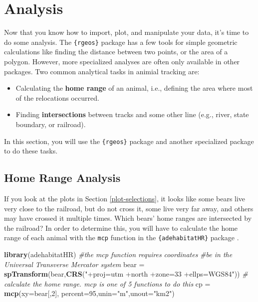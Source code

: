 \documentclass[]{book}
\newenvironment{Shaded}{\begin{snugshade}}{\end{snugshade}}
\newcommand{\KeywordTok}[1]{\textcolor[rgb]{0.13,0.29,0.53}{\textbf{#1}}}
\newcommand{\DataTypeTok}[1]{\textcolor[rgb]{0.13,0.29,0.53}{#1}}
\newcommand{\DecValTok}[1]{\textcolor[rgb]{0.00,0.00,0.81}{#1}}
\newcommand{\StringTok}[1]{\textcolor[rgb]{0.31,0.60,0.02}{#1}}
\newcommand{\CommentTok}[1]{\textcolor[rgb]{0.56,0.35,0.01}{\textit{#1}}}
\newcommand{\NormalTok}[1]{#1}
\providecommand{\tightlist}{%
  \setlength{\itemsep}{0pt}\setlength{\parskip}{0pt}}
\theoremstyle{definition}
\theoremstyle{definition}
\theoremstyle{definition}
\theoremstyle{remark}
\begin{document}
\section{Analysis}\label{Anal}

Now that you know how to import, plot, and manipulate your data, it's
time to do some analysis. The \texttt{\{rgeos\}} package \citep{R-rgeos}
has a few tools for simple geometric calculations like finding the
distance between two points, or the area of a polygon. However, more
specialized analyses are often only available in other packages. Two
common analytical tasks in animial tracking are:

\begin{itemize}
\tightlist
\item
  Calculating the \textbf{home range} of an animal, i.e., defining the
  area where most of the relocations occurred.
\item
  Finding \textbf{intersections} between tracks and some other line
  (e.g., river, state boundary, or railroad).
\end{itemize}

In this section, you will use the \texttt{\{rgeos\}} package and another
specialized package to do these tasks.

\subsection{Home Range Analysis}\label{hr-Anal}

If you look at the plots in Section \ref{plot-selections}, it looks like
some bears live very close to the railroad, but do not cross it, some
live very far away, and others may have crossed it multiple times. Which
bears' home ranges are intersected by the railroad? In order to
determine this, you will have to calculate the home range of each animal
with the \texttt{mcp} function in the \texttt{\{adehabitatHR\}} package
\citep{R-adehabitatHR}.

\begin{Shaded}
\begin{Highlighting}[]
\KeywordTok{library}\NormalTok{(adehabitatHR) }
\CommentTok{#the mcp function requires coordinates }
\CommentTok{#be in the Universal Transverse Mercator system}
\NormalTok{bear =}\StringTok{ }\KeywordTok{spTransform}\NormalTok{(bear,}\KeywordTok{CRS}\NormalTok{(}\StringTok{"+proj=utm +north +zone=33 +ellps=WGS84"}\NormalTok{))}
\CommentTok{# calculate the home range. mcp is one of 5 functions to do this}
\NormalTok{cp =}\StringTok{ }\KeywordTok{mcp}\NormalTok{(}\DataTypeTok{xy=}\NormalTok{bear[,}\DecValTok{2}\NormalTok{], }\DataTypeTok{percent=}\DecValTok{95}\NormalTok{,}\DataTypeTok{unin=}\StringTok{"m"}\NormalTok{,}\DataTypeTok{unout=}\StringTok{"km2"}\NormalTok{) }
\end{Highlighting}
\end{Shaded}
\end{document}
